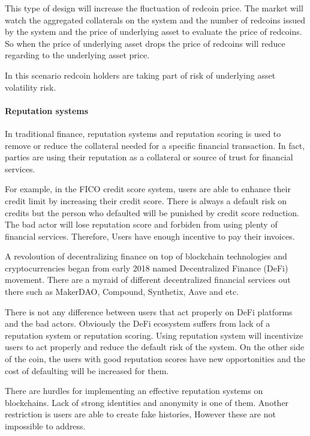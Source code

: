 This type of design will increase the fluctuation of redcoin price. The market will watch the aggregated collaterals on the system and the number of redcoins issued by the system and the price of underlying asset to evaluate the price of redcoins. So when the price of underlying asset drops the price of redcoins will reduce regarding to the underlying asset price. 

In this scenario redcoin holders are taking part of risk of underlying asset volatility risk.

\paragraph{Reputation systems}

In traditional finance, reputation systems and reputation scoring is used to remove or reduce the collateral needed for a specific financial transaction. In fact, parties are using their reputation as a collateral or source of trust for financial services. 

For example, in the FICO credit score system, users are able to enhance their credit limit by increasing their credit score. There is always a default risk on credits but the person who defaulted will be punished by credit score reduction. The bad actor will lose reputation score and forbiden from using plenty of financial services. Therefore, Users have enough incentive to pay their invoices.

A revoloution of decentralizing finance on top of blockchain technologies and cryptocurrencies began from early 2018 named Decentralized Finance (DeFi) movement. There are a myraid of different decentralized financial services out there such as MakerDAO, Compound, Synthetix, Aave and etc. 

There is not any difference between users that act properly on DeFi platforms and the bad actors. Obviously the DeFi ecosystem suffers from lack of a reputation system or reputation scoring. Using reputation system will incentivize users to act properly and reduce the default risk of the system. On the other side of the coin, the users with good reputation scores have new opportonities and the cost of defaulting will be increased for them.

There are hurdles for implementing an effective reputation systems on blockchains. Lack of strong identities and anonymity is one of them. Another restriction is users are able to create fake histories, However these are not impossible to address.


